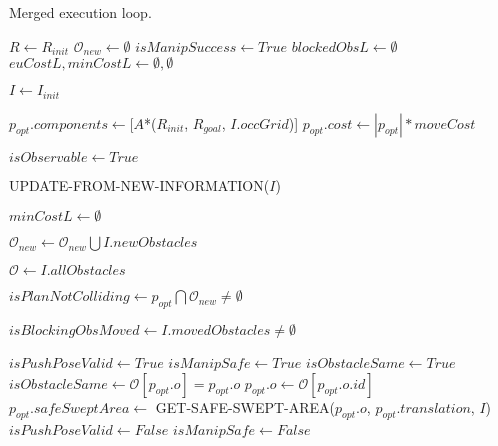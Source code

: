 \begin{algorithm}[H]

  \caption{Merged execution loop.}

  \label{alg:07-custom-merge-makeandexecuteplan-part1}

  \begin{algorithmic}[1]


      \State $R \gets R_{init}$
      \State $\mathcal{O}_{new} \gets \emptyset$
      \State $isManipSuccess \gets True$
      \State $blockedObsL \gets \emptyset$
      \State $euCostL, minCostL \gets \emptyset, \emptyset$

      \State $I \gets I_{init}$

      \State $p_{opt}.components \gets [$$A$*($R_{init}$, $R_{goal}$, $I.occGrid$)]
      \State $p_{opt}.cost \gets |p_{opt}| * moveCost$

      \State $isObservable \gets True$


        \State UPDATE-FROM-NEW-INFORMATION($I$)

          \State $minCostL \gets \emptyset$
        \EndIf

        \State $\mathcal{O}_{new} \gets \mathcal{O}_{new} \bigcup I.newObstacles$

        \State $\mathcal{O} \gets I.allObstacles$

        \State $isPlanNotColliding \gets p_{opt} \bigcap \mathcal{O}_{new} \neq \emptyset$

        \State $isBlockingObsMoved \gets I.movedObstacles \neq \emptyset$

        \State $isPushPoseValid \gets True$
        \State $isManipSafe \gets True$
        \State $isObstacleSame \gets True$
          \State $isObstacleSame \gets \mathcal{O}[p_{opt}.o] = p_{opt}.o$
            \State $p_{opt}.o \gets \mathcal{O}[p_{opt}.o.id]$
            \State $p_{opt}.safeSweptArea \gets$ GET-SAFE-SWEPT-AREA($p_{opt}.o$, $p_{opt}.translation$, $I$)
              \State $isPushPoseValid \gets False$
            \EndIf
          \EndIf
            \State $isManipSafe \gets False$
          \EndIf
        \EndIf


\end{algorithmic}
\end{algorithm}
